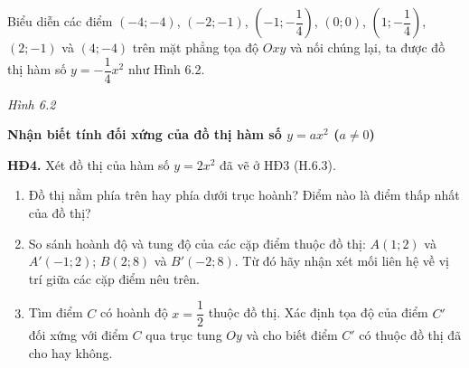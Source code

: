 \begin{lesson}
    Biểu diễn các điểm $(-4;-4)$, $(-2;-1)$, $\left(-1;-\dfrac{1}{4}\right)$, $(0;0)$, $\left(1;-\dfrac{1}{4}\right)$, $(2;-1)$ và $(4;-4)$ trên mặt phẳng tọa độ $Oxy$ và nối chúng lại, ta được đồ thị hàm số $y=-\dfrac{1}{4}x^2$ như Hình 6.2.

    \begin{center}

    \textit{Hình 6.2}
    \end{center}

    \textbf{Nhận biết tính đối xứng của đồ thị hàm số $y=ax^2$ ($a\ne0$)}

    \textbf{HĐ4.} Xét đồ thị của hàm số $y=2x^2$ đã vẽ ở HĐ3 (H.6.3).
    \begin{enumerate}[label=\alph*)]
        \item Đồ thị nằm phía trên hay phía dưới trục hoành? Điểm nào là điểm thấp nhất của đồ thị?
        \item So sánh hoành độ và tung độ của các cặp điểm thuộc đồ thị: $A(1;2)$ và $A'(-1;2)$; $B(2;8)$ và $B'(-2;8)$. Từ đó hãy nhận xét mối liên hệ về vị trí giữa các cặp điểm nêu trên.
        \item Tìm điểm $C$ có hoành độ $x=\dfrac{1}{2}$ thuộc đồ thị. Xác định tọa độ của điểm $C'$ đối xứng với điểm $C$ qua trục tung $Oy$ và cho biết điểm $C'$ có thuộc đồ thị đã cho hay không.
    \end{enumerate}


\end{lesson}
